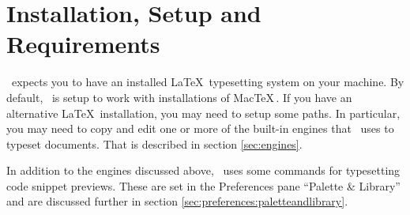 \chapter{Installation, Setup and Requirements}
\label{ch:installation}

\texnicle\ expects you to have an installed \LaTeX\ typesetting system on your
machine. By default, \texnicle\ is setup to work with installations of MacTeX\,\cite{mactex}.
If you have an alternative \LaTeX\ installation, you may need to setup some
paths. In particular, you may need to copy and edit one or more of the built-in
engines that \texnicle\ uses to typeset documents. That is described in section
\ref{sec:engines}.

In addition to the engines discussed above, \texnicle\ uses some commands for
typesetting code snippet previews. These are set in the Preferences pane
``Palette \& Library'' and are discussed further in section
\ref{sec:preferences:paletteandlibrary}.




